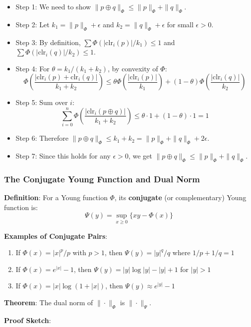 \documentclass{amsart}
\theoremstyle{plain}
\theoremstyle{definition}
\theoremstyle{remark}
\begin{document}
\begin{itemize}
	\item Step 1: We need to show $\|p \oplus q\|_\Phi \leq \|p\|_\Phi + \|q\|_\Phi$.
	\item Step 2: Let $k_1 = \|p\|_\Phi + \epsilon$ and $k_2 = \|q\|_\Phi + \epsilon$ for small $\epsilon > 0$.
	\item Step 3: By definition, $\sum \Phi(|\text{clr}_i(p)|/k_1) \leq 1$ and $\sum \Phi(|\text{clr}_i(q)|/k_2) \leq 1$.
	\item Step 4: For $\theta = k_1/(k_1 + k_2)$, by convexity of $\Phi$:
\[
\Phi\left(\frac{|\text{clr}_i(p) + \text{clr}_i(q)|}{k_1 + k_2}\right) \leq \theta \Phi\left(\frac{|\text{clr}_i(p)|}{k_1}\right) + (1-\theta) \Phi\left(\frac{|\text{clr}_i(q)|}{k_2}\right)
\]
	\item Step 5: Sum over $i$:
\[
\sum_{i=0}^n \Phi\left(\frac{|\text{clr}_i(p \oplus q)|}{k_1 + k_2}\right) \leq \theta \cdot 1 + (1-\theta) \cdot 1 = 1
\]
	\item Step 6: Therefore $\|p \oplus q\|_\Phi \leq k_1 + k_2 = \|p\|_\Phi + \|q\|_\Phi + 2\epsilon$.
	\item Step 7: Since this holds for any $\epsilon > 0$, we get $\|p \oplus q\|_\Phi \leq \|p\|_\Phi + \|q\|_\Phi$.
\end{itemize}

\subsubsection{The Conjugate Young Function and Dual Norm}

\textbf{Definition}: For a Young function $\Phi$, its \textbf{conjugate} (or complementary) Young function is:
\[
\Psi(y) = \sup_{x \geq 0} \{xy - \Phi(x)\}
\]

\textbf{Examples of Conjugate Pairs}:

\begin{enumerate}
	\item If $\Phi(x) = |x|^p/p$ with $p > 1$, then $\Psi(y) = |y|^q/q$ where $1/p + 1/q = 1$
	\item If $\Phi(x) = e^{|x|} - 1$, then $\Psi(y) = |y|\log|y| - |y| + 1$ for $|y| > 1$
	\item If $\Phi(x) = |x|\log(1 + |x|)$, then $\Psi(y) \approx e^{|y|} - 1$
\end{enumerate}

\textbf{Theorem}: The dual norm of $\|\cdot\|_\Phi$ is $\|\cdot\|_\Psi$.

\textbf{Proof Sketch}:
\end{document}
